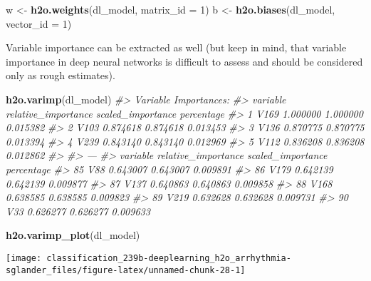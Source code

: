 \documentclass[]{book}
\newenvironment{Shaded}{\begin{snugshade}}{\end{snugshade}}
\newcommand{\CommentTok}[1]{\textcolor[rgb]{0.56,0.35,0.01}{\textit{#1}}}
\newcommand{\DataTypeTok}[1]{\textcolor[rgb]{0.13,0.29,0.53}{#1}}
\newcommand{\DecValTok}[1]{\textcolor[rgb]{0.00,0.00,0.81}{#1}}
\newcommand{\KeywordTok}[1]{\textcolor[rgb]{0.13,0.29,0.53}{\textbf{#1}}}
\newcommand{\NormalTok}[1]{#1}
\newcommand{\StringTok}[1]{\textcolor[rgb]{0.31,0.60,0.02}{#1}}
\begin{document}
\begin{Shaded}
\begin{Highlighting}[]
\NormalTok{w <-}\StringTok{ }\KeywordTok{h2o.weights}\NormalTok{(dl_model, }\DataTypeTok{matrix_id =} \DecValTok{1}\NormalTok{)}
\NormalTok{b <-}\StringTok{ }\KeywordTok{h2o.biases}\NormalTok{(dl_model, }\DataTypeTok{vector_id =} \DecValTok{1}\NormalTok{)}
\end{Highlighting}
\end{Shaded}

Variable importance can be extracted as well (but keep in mind, that variable importance in deep neural networks is difficult to assess and should be considered only as rough estimates).

\begin{Shaded}
\begin{Highlighting}[]
\KeywordTok{h2o.varimp}\NormalTok{(dl_model)}
\CommentTok{#> Variable Importances: }
\CommentTok{#>   variable relative_importance scaled_importance percentage}
\CommentTok{#> 1     V169            1.000000          1.000000   0.015382}
\CommentTok{#> 2     V103            0.874618          0.874618   0.013453}
\CommentTok{#> 3     V136            0.870775          0.870775   0.013394}
\CommentTok{#> 4     V239            0.843140          0.843140   0.012969}
\CommentTok{#> 5     V112            0.836208          0.836208   0.012862}
\CommentTok{#> }
\CommentTok{#> ---}
\CommentTok{#>    variable relative_importance scaled_importance percentage}
\CommentTok{#> 85      V88            0.643007          0.643007   0.009891}
\CommentTok{#> 86     V179            0.642139          0.642139   0.009877}
\CommentTok{#> 87     V137            0.640863          0.640863   0.009858}
\CommentTok{#> 88     V168            0.638585          0.638585   0.009823}
\CommentTok{#> 89     V219            0.632628          0.632628   0.009731}
\CommentTok{#> 90      V33            0.626277          0.626277   0.009633}
\end{Highlighting}
\end{Shaded}

\begin{Shaded}
\begin{Highlighting}[]
\KeywordTok{h2o.varimp_plot}\NormalTok{(dl_model)}
\end{Highlighting}
\end{Shaded}

\begin{center}\texttt{[image: classification\_239b-deeplearning\_h2o\_arrhythmia-sglander\_files/figure-latex/unnamed-chunk-28-1]} \end{center}
\end{document}

